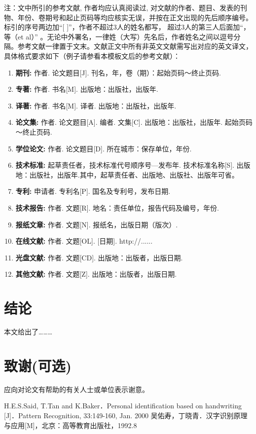 \documentclass[UTF8]{csoarticle}
\begin{document}
注：文中所引的参考文献, 作者均应认真阅读过, 对文献的作者、题目、发表的刊物、年份、卷期号和起止页码等均应核实无误，并按在正文出现的先后顺序编号。标引的序号两边加“[ ]”，作者不超过3人的姓名都写， 超过3人的第三人后面加“，等（et al）” 。无论中外署名，一律姓（大写）先名后，作者姓名之间以逗号分隔。参考文献一律置于文末。文献正文中所有非英文文献需写出对应的英文译文，具体格式要求如下（例子请参看本模板文后的参考文献）：
\begin{enumerate}
\item\textbf{期刊:}     作者. 论文题目[J]. 刊名，年，卷（期）：起始页码～终止页码.
\item\textbf{专著:}     作者. 书名[M]. 出版地：出版社，出版年.
\item\textbf{译著:}     作者. 书名[M]. 译者. 出版地：出版社，出版年.
\item\textbf{论文集:}   作者. 论文题目[A]. 编者. 文集[C]. 出版地：出版社，出版年. 起始页码～终止页码.
\item\textbf{学位论文:} 作者. 论文题目[D]. 所在城市：保存单位，年份.
\item\textbf{技术标准:} 起草责任者，技术标准代号顺序号—发布年. 技术标准名称[S]. 出版地：出版社，出版年.其中，起草责任者、出版地、出版社、出版年可省。
\item\textbf{专利:}     申请者. 专利名[P]. 国名及专利号，发布日期.
\item\textbf{技术报告:} 作者. 文题[R]. 地名：责任单位，报告代码及编号，年份.
\item\textbf{报纸文章:} 作者. 文题[N]. 报纸名，出版日期（版次）.
\item\textbf{在线文献:} 作者. 文题[OL]. [日期]. http://......
\item\textbf{光盘文献:} 作者. 文题[CD]. 出版地：出版者，出版日期.
\item\textbf{其他文献:} 作者. 文题[Z]. 出版地：出版者，出版日期.
\end{enumerate}

\section{结论}

本文给出了………

\section*{致谢(可选)}

应向对论文有帮助的有关人士或单位表示谢意。



\begin{thebibliography}{2} %
     H.E.S.Said, T.Tan and K.Baker．Personal identification based on handwriting [J]．Pattern Recognition, 33:149-160, Jan. 2000
     吴佑寿，丁晓青．汉字识别原理与应用[M]，北京：高等教育出版社，1992.8
\end{thebibliography}
\end{document}
